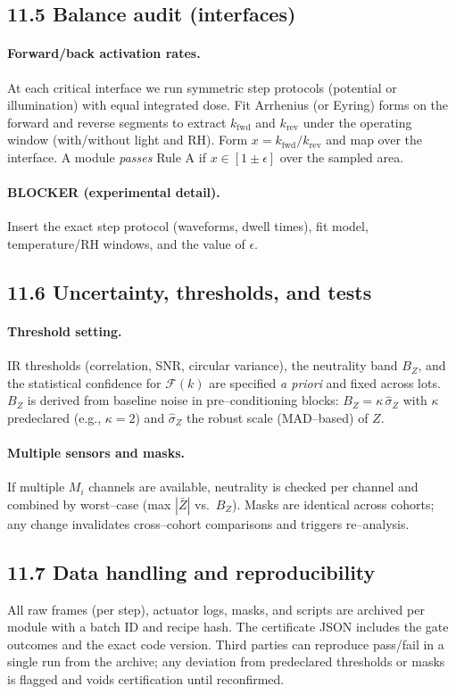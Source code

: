 \documentclass[12pt]{article}
\begin{document}
\subsection*{11.5 Balance audit (interfaces)}
\paragraph{Forward/back activation rates.}
At each critical interface we run symmetric step protocols (potential or illumination) with equal integrated dose. Fit Arrhenius (or Eyring) forms on the forward and reverse segments to extract $k_{\mathrm{fwd}}$ and $k_{\mathrm{rev}}$ under the operating window (with/without light and RH). Form $x=k_{\mathrm{fwd}}/k_{\mathrm{rev}}$ and map over the interface. A module \emph{passes} Rule A if $x\in[1\pm\epsilon]$ over the sampled area. 

\paragraph{BLOCKER (experimental detail).}
Insert the exact step protocol (waveforms, dwell times), fit model, temperature/RH windows, and the value of $\epsilon$.

\subsection*{11.6 Uncertainty, thresholds, and tests}
\paragraph{Threshold setting.}
IR thresholds (correlation, SNR, circular variance), the neutrality band $B_Z$, and the statistical confidence for $\mathcal{F}(k)$ are specified \emph{a priori} and fixed across lots. $B_Z$ is derived from baseline noise in pre–conditioning blocks: $B_Z=\kappa\,\hat\sigma_Z$ with $\kappa$ predeclared (e.g., $\kappa=2$) and $\hat\sigma_Z$ the robust scale (MAD–based) of $Z$.

\paragraph{Multiple sensors and masks.}
If multiple $M_i$ channels are available, neutrality is checked per channel and combined by worst–case (max $|\bar Z|$ vs.\ $B_Z$). Masks are identical across cohorts; any change invalidates cross–cohort comparisons and triggers re–analysis.

\subsection*{11.7 Data handling and reproducibility}
All raw frames (per step), actuator logs, masks, and scripts are archived per module with a batch ID and recipe hash. The certificate JSON includes the gate outcomes and the exact code version. Third parties can reproduce pass/fail in a single run from the archive; any deviation from predeclared thresholds or masks is flagged and voids certification until reconfirmed.
\end{document}
